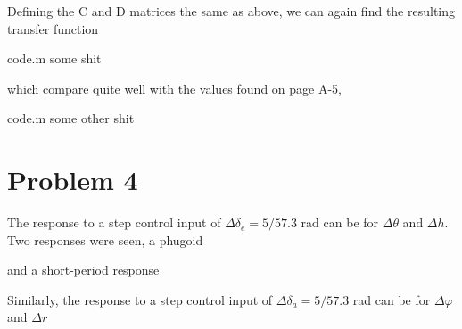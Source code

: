 \documentclass[12pt]{article}
\begin{document}
\noindent Defining the C and D matrices the same as above, we can again find the resulting transfer function

\begin{filecontents*}{code.m}
some shit
\end{filecontents*}


\noindent which compare quite well with the values found on page A-5,

\begin{filecontents*}{code.m}
some other shit
\end{filecontents*}


\newpage
\section{Problem 4}
The response to a step control input of $\Delta \delta_e = 5/57.3$ rad can be for $\Delta \theta$ and $\Delta h$. Two responses were seen, a phugoid

\noindent and a short-period response

\noindent Similarly, the response to a step control input of $\Delta \delta_a = 5/57.3$ rad can be for $\Delta \varphi$ and $\Delta r$
\end{document}
